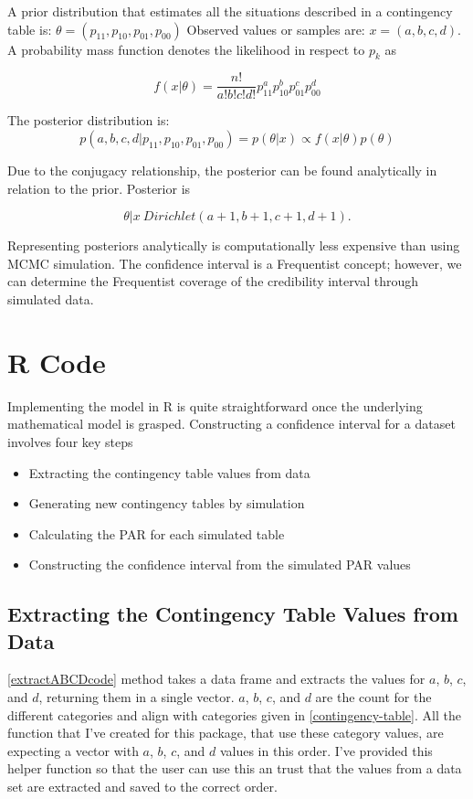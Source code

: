 A prior distribution that estimates all the situations described in a contingency table is: $\theta = (p_{11}, p_{10}, p_{01}, p_{00})$
Observed values or samples are: $x = (a, b, c, d)$. A probability mass function denotes the likelihood in respect to $p_k$ as

\begin{equation}
    f(x|\theta) = \frac{n!}{a!b!c!d!}p_{11}^ap_{10}^bp_{01}^cp_{00}^d
\end{equation}

The posterior distribution is:
\begin{equation}
    p(a,b,c,d|p_{11}, p_{10},p_{01},p_{00}) = p(\theta|x) \propto  f (x|\theta)p(\theta)
\end{equation}

Due to the conjugacy relationship, the posterior can be found analytically in relation to the prior. Posterior is

\begin{equation}
    \theta|x ~ Dirichlet(a + 1, b + 1, c + 1, d + 1).
\end{equation}

Representing posteriors analytically is computationally less expensive than using MCMC simulation. The confidence interval is a Frequentist concept; however, we can determine the Frequentist coverage of the credibility interval through simulated data.

\section{R Code} \label{CodeImplementation}

Implementing the model in R is quite straightforward once the underlying mathematical model is grasped. Constructing a confidence interval for a dataset involves four key steps
\begin{itemize}
    \item Extracting the contingency table values from data
    \item Generating new contingency tables by simulation
    \item Calculating the PAR for each simulated table
    \item Constructing the confidence interval from the simulated PAR values
\end{itemize}

\subsection{Extracting the Contingency Table Values from Data}
\ref{extractABCDcode} method takes a data frame and extracts the values for $a$, $b$, $c$, and $d$, returning them in a single vector. $a$, $b$, $c$, and $d$ are the count for the different categories and align with categories given in \ref{contingency-table}. All the function that I've created for this package, that use these category values, are expecting a vector with $a$, $b$, $c$, and $d$ values in this order. I've provided this helper function so that the user can use this an trust that the values from a data set are extracted and saved to the correct order.

